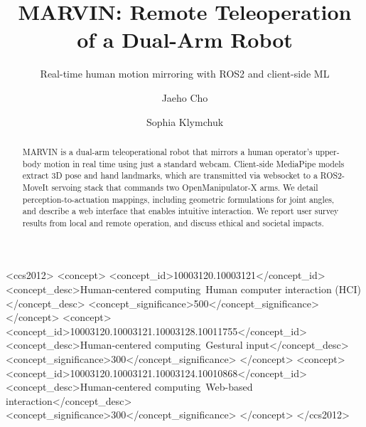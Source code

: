 \documentclass[acmsmall, screen]{acmart}
\begin{document}
\title{MARVIN: Remote Teleoperation of a Dual-Arm Robot}
\subtitle{Real-time human motion mirroring with ROS2 and client-side ML}

\author{Jaeho Cho}
\author{Sophia Klymchuk}
\authornotemark[1]

\renewcommand{\shortauthors}{Cho and Klymchuk}

\begin{abstract}
MARVIN is a dual-arm teleoperational robot that mirrors a human operator's upper-body motion in real time using just a standard webcam. Client-side MediaPipe models extract 3D pose and hand landmarks, which are transmitted via websocket to a ROS2-MoveIt servoing stack that commands two OpenManipulator-X arms. We detail perception-to-actuation mappings, including geometric formulations for joint angles, and describe a web interface that enables intuitive interaction. We report user survey results from local and remote operation, and discuss ethical and societal impacts.
\end{abstract}

\begin{CCSXML}
<ccs2012>
   <concept>
       <concept_id>10003120.10003121</concept_id>
       <concept_desc>Human-centered computing~Human computer interaction (HCI)</concept_desc>
       <concept_significance>500</concept_significance>
       </concept>
   <concept>
       <concept_id>10003120.10003121.10003128.10011755</concept_id>
       <concept_desc>Human-centered computing~Gestural input</concept_desc>
       <concept_significance>300</concept_significance>
       </concept>
   <concept>
       <concept_id>10003120.10003121.10003124.10010868</concept_id>
       <concept_desc>Human-centered computing~Web-based interaction</concept_desc>
       <concept_significance>300</concept_significance>
       </concept>
 </ccs2012>
\end{CCSXML}

\end{document}
